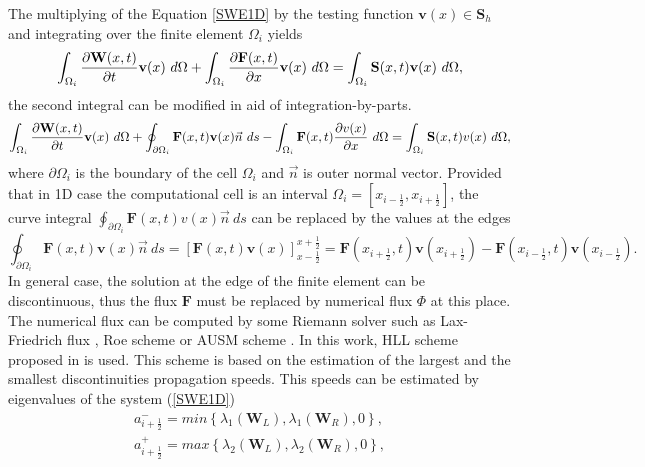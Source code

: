 The multiplying of the Equation \ref{SWE1D} by the testing function $\textbf{v}(x)\in \mathbf{S}_h$ and integrating over the finite element $\Omega_i$ yields
\begin{equation}\label{testF}
\int_{\Omega_i}\parc{\mathbf{W}(x,t)}{t} \textbf{v}(x)  \ d\Omega +\int_{\Omega_i} \parc{\mathbf{F}(x,t)}{x}\mathbf{v}(x) \ d\Omega=\int_{\Omega_i}\mathbf{S}(x,t)\textbf{v}(x) \ d\Omega,
\end{equation}
the second integral can be modified in aid of integration-by-parts.
\begin{equation}\label{testF1D}
\int_{\Omega_i}\parc{\mathbf{W}(x,t)}{t} \textbf{v}(x)  \ d\Omega +\oint_{\partial \Omega_i} \mathbf{F}(x,t) \textbf{v}(x) \vec{n} \ ds-\int_{\Omega_i} \mathbf{F}(x,t)\parc{v(x)}{x} \ d\Omega=\int_{\Omega_i}\mathbf{S}(x,t)v(x) \ d\Omega,
\end{equation}
where $\partial \Omega_i$ is the boundary of the cell $\Omega_i$ and $\vec{n}$ is outer normal vector. Provided that in 1D case the computational cell is an interval $\Omega_i=[x_{i-\frac12},x_{i+\frac12}]$, the curve integral $\oint_{\partial \Omega_i} \mathbf{F}(x,t) v(x)\vec{n} \ ds$ can be replaced by the values at the edges
\begin{equation}
\oint_{\partial \Omega_i} \mathbf{F}(x,t) \mathbf{v}(x)\vec{n} \ ds=\left[ \mathbf{F}(x,t) \mathbf{v}(x)\right]_{x-\frac12}^{x+\frac12}= \mathbf{F}(x_{i+\frac12},t) \mathbf{v}(x_{i+\frac12})-\mathbf{F}(x_{i-\frac12},t) \mathbf{v}(x_{i-\frac12}).
\end{equation}
In general case, the solution at the edge of the finite element can be discontinuous, thus the flux $\mathbf{F}$  must be replaced by numerical flux $\Phi$ at this place. The numerical flux can be computed by some Riemann solver such as Lax-Friedrich flux \cite{Lax1954}, Roe scheme \cite{roe} or AUSM scheme \cite{ausm}. In this work, HLL scheme proposed in \cite{harten1983} is used. This scheme is based on the estimation of the largest and the smallest discontinuities propagation speeds. This speeds can be estimated by eigenvalues of the system (\ref{SWE1D})
\begin{equation}\label{rychlosticky}
 \begin{array}{ccc}
a_{i+\frac12}^-=min\left\{\lambda_1\left(\mathbf{W}_L\right),\lambda_1\left(\mathbf{W}_R\right),0\right\},\\
a_{i+\frac12}^+=max\left\{\lambda_2\left(\mathbf{W}_L\right),\lambda_2\left(\mathbf{W}_R\right),0\right\},
\end{array}
\end{equation}
